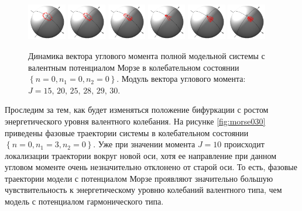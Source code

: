 \begin{figure}[H]
  \centering
	\includegraphics[width=0.15\textwidth]{../pictures/MorseGroundState00/plot_J=15.png}
	\includegraphics[width=0.15\textwidth]{../pictures/MorseGroundState00/plot_J=20.png}
	\includegraphics[width=0.15\textwidth]{../pictures/MorseGroundState00/plot_J=25.png}
	\includegraphics[width=0.15\textwidth]{../pictures/MorseGroundState00/plot_J=28.png}
	\includegraphics[width=0.15\textwidth]{../pictures/MorseGroundState00/plot_J=29.png}
	\includegraphics[width=0.15\textwidth]{../pictures/MorseGroundState00/plot_J=30.png}
	\caption{Динамика вектора углового момента полной модельной системы с валентным потенциалом Морзе в колебательном состоянии $\left\{ n = 0, n_1 = 0, n_2 = 0 \right\}$. Модуль вектора углового момента: $J = 15, \, 20, \, 25, \, 28, \, 29, \, 30$.} 
\label{fig:morse000}
\end{figure}

Проследим за тем, как будет изменяться положение бифуркации с ростом энергетического уровня валентного колебания. На рисунке \eqref{fig:morse030} приведены фазовые траектории системы в колебательном состоянии $\left\{ n = 0, n_1 = 3, n_2 = 0 \right\}$.  Уже при значении момента $J = 10$ происходит локализации траектории вокруг новой оси, хотя ее направление при данном угловом моменте очень незначительно отклонено от старой оси. То есть, фазовые траектории модели с потенциалом Морзе проявляют значительно большую чувствительность к энергетическому уровню колебаний валентного типа, чем модель с потенциалом гармонического типа.

